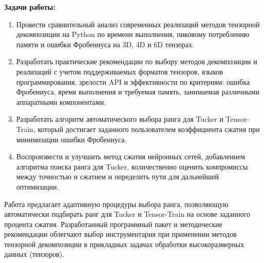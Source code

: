 \noindent\textbf{Задачи работы:}
\begin{enumerate}
  \item Провести сравнительный анализ современных реализаций методов тензорной декомпозиции на Python по времени выполнения, пиковому потреблению памяти и ошибки Фробениуса на 3D, 4D и 6D тензорах.
  \item Разработать практические рекомендации по выбору методов декомпозиции и реализаций с учетом поддерживаемых форматов тензоров, языков программирования, зрелости API и эффективности по критериям: ошибка Фробениуса, время выполнения и требуемая память, занимаемая различными аппаратными компонентами.
  \item Разработать алгоритм автоматического выбора ранга для Tucker и Tensor-Train, который достигает заданного пользователем коэффициента сжатия при минимизации ошибки Фробениуса.
  \item Воспроизвести и улучшить метод сжатия нейронных сетей, добавлением алгоритма поиска ранга для Tucker, количественно оценить компромиссы между точностью и сжатием и определить пути для дальнейшей оптимизации.
\end{enumerate}

Работа предлагает адаптивную процедуры выбора ранга, позволяющую автоматически подбирать ранг для Tucker и Tensor-Train на основе заданного процента сжатия. Разработанный программный пакет и методические рекомендации облегчают выбор инструментария при применении методов тензорной декомпозиции в прикладных задачах обработки высокоразмерных данных (тензоров).